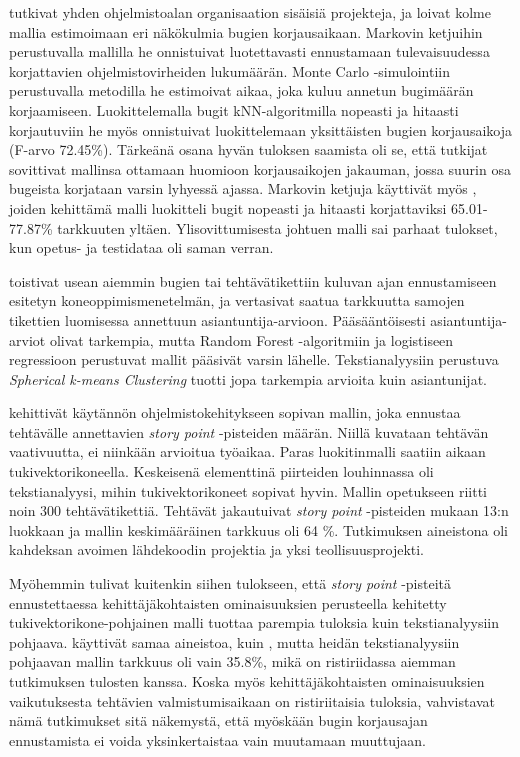 \documentclass[utf8]{gradu3}
\begin{document}
\textcite{Zhang-2013} tutkivat yhden ohjelmistoalan organisaation sisäisiä
projekteja, ja loivat kolme mallia estimoimaan eri näkökulmia bugien
korjausaikaan. Markovin ketjuihin perustuvalla mallilla he onnistuivat
luotettavasti ennustamaan tulevaisuudessa korjattavien ohjelmistovirheiden
lukumäärän. Monte Carlo -simulointiin perustuvalla metodilla he estimoivat
aikaa, joka kuluu annetun bugimäärän korjaamiseen. Luokittelemalla bugit
kNN-algoritmilla nopeasti ja hitaasti korjautuviin he myös onnistuivat
luokittelemaan yksittäisten bugien korjausaikoja (F-arvo 72.45\%). Tärkeänä
osana hyvän tuloksen saamista oli se, että tutkijat sovittivat mallinsa ottamaan
huomioon korjausaikojen jakauman, jossa suurin osa bugeista korjataan varsin
lyhyessä ajassa. Markovin ketjuja käyttivät myös \textcite{Pombo-2020}, joiden
kehittämä malli luokitteli bugit nopeasti ja hitaasti korjattaviksi
65.01-77.87\% tarkkuuten yltäen. Ylisovittumisesta johtuen malli sai parhaat
tulokset, kun opetus- ja testidataa oli saman verran.

\textcite{Pfahl-2016} toistivat usean aiemmin bugien tai tehtävätikettiin
kuluvan ajan ennustamiseen esitetyn koneoppimismenetelmän, ja vertasivat saatua
tarkkuutta samojen tikettien luomisessa annettuun asiantuntija-arvioon.
Pääsääntöisesti asiantuntija-arviot olivat tarkempia, mutta Random Forest
-algoritmiin ja logistiseen regressioon perustuvat mallit pääsivät varsin
lähelle. Tekstianalyysiin perustuva \textit{Spherical k-means Clustering} tuotti
jopa tarkempia arvioita kuin asiantunijat.

\textcite{Porru-2016} kehittivät käytännön ohjelmistokehitykseen sopivan mallin,
joka ennustaa tehtävälle annettavien \textit{story point} -pisteiden määrän.
Niillä kuvataan tehtävän vaativuutta, ei niinkään arvioitua työaikaa. Paras
luokitinmalli saatiin aikaan tukivektorikoneella. Keskeisenä elementtinä
piirteiden louhinnassa oli tekstianalyysi, mihin tukivektorikoneet sopivat
hyvin. Mallin opetukseen riitti noin 300 tehtävätikettiä. Tehtävät jakautuivat
\textit{story point} -pisteiden mukaan 13:n luokkaan ja mallin keskimääräinen
tarkkuus oli 64 \%. Tutkimuksen aineistona oli kahdeksan avoimen lähdekoodin
projektia ja yksi teollisuusprojekti.

Myöhemmin \textcite{Scott-2018} tulivat kuitenkin siihen tulokseen, että
\textit{story point} -pisteitä ennustettaessa kehittäjäkohtaisten ominaisuuksien
perusteella kehitetty tukivektorikone-pohjainen malli tuottaa parempia tuloksia
kuin tekstianalyysiin pohjaava. \textcite{Scott-2018} käyttivät samaa aineistoa,
kuin \textcite{Porru-2016}, mutta heidän tekstianalyysiin pohjaavan mallin
tarkkuus oli vain 35.8\%, mikä on ristiriidassa aiemman tutkimuksen tulosten
kanssa. Koska myös kehittäjäkohtaisten ominaisuuksien vaikutuksesta tehtävien
valmistumisaikaan on ristiriitaisia tuloksia, vahvistavat nämä tutkimukset sitä
näkemystä, että myöskään bugin korjausajan ennustamista ei voida yksinkertaistaa
vain muutamaan muuttujaan.
\end{document}
